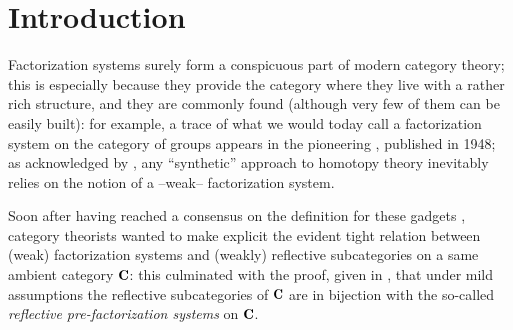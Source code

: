 \section*{Introduction}
Factorization systems surely form a conspicuous part of modern category theory; this is especially because they provide the category where they live with a rather rich structure, and they are commonly found (although very few of them can be easily built): for example, a trace of what we would today call a factorization system on the category of groups appears in the pioneering \cite{maclane1948groups}, published in 1948; as acknowledged by \cite{whitehead61elements}, any ``synthetic'' approach to homotopy theory inevitably relies on the notion of a --weak-- factorization system.

Soon after having reached a consensus on the definition for these gadgets \cite{FK}, category theorists wanted to make explicit the evident tight relation between (weak) factorization systems and (weakly) reflective subcategories on a same ambient category $\C$: this culminated with the proof, given in \cite{CHK}, that under mild assumptions the reflective subcategories of $\C$ are in bijection with the so-called \emph{reflective pre-factorization systems} on $\C$. 

